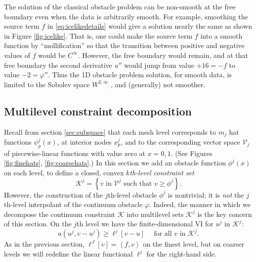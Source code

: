 \documentclass[letterpaper,final,12pt,reqno]{amsart}
\theoremstyle{claim}
\newcommand{\ip}[2]{\left<#1,#2\right>}
\numberwithin{equation}{section}
\numberwithin{figure}{section}
\numberwithin{table}{section}
\begin{document}
The solution of the classical obstacle problem can be non-smooth at the free boundary even when the data is arbitrarily smooth.  For example, smoothing the source term $f$ in \eqref{eq:icelikedetails} would give a solution nearly the same as shown in Figure \ref{fig:icelike}.  That is, one could make the source term $f$ into a smooth function by ``mollification'' \cite{Evans2010} so that the transition between positive and negative values of $f$ would be $C^\infty$.  However, the free boundary would remain, and at that free boundary the second derivative $u''$ would jump from value $+16=-f$ to value $-2=\varphi''$.  Thus the 1D obstacle problem solution, for smooth data, is limited to the Sobolev space $W^{2,\infty}$ \cite[section IV.6]{KinderlehrerStampacchia1980}, and (generally) not smoother.

\subsection*{Multilevel constraint decomposition}  Recall from section \ref{sec:subspace} that each mesh level corresponds to $m_j$ hat functions $\psi_p^j(x)$, at interior nodes $x_p^j$, and to the corresponding vector space $\mathcal{V}_j$ of piecewise-linear functions with value zero at $x=0,1$.  (See Figures \ref{fig:finehats}, \ref{fig:coarsehats}.)  In this section we add an obstacle function $\phi^j(x)$ on each level, to define a closed, convex $k$\emph{th-level constraint set}
\begin{equation}
\mathcal{K}^j = \left\{v \text{ in } \mathcal{V}^j \text{ such that } v \ge \phi^j\right\}.  \label{eq:levelKdefine}
\end{equation}
However, the construction of the $j$th-level obstacle $\phi^j$ is nontrivial; it is \emph{not} the $j$th-level interpolant of the continuum obstacle $\varphi$.  Indeed, the manner in which we decompose the continuum constraint $\mathcal{K}$ into multilevel sets $\mathcal{K}^j$ is the key concern of this section.  On the $j$th level we have the finite-dimensional VI for $u^j$ in $\mathcal{K}^j$:
\begin{equation}
  a(u^j,v-u^j) \ge \ell^j[v-u] \quad \text{ for all } v \text{ in } \mathcal{K}^j. \label{eq:levelvi}
\end{equation}
As in the previous section, $\ell^J[v]=\ip{f}{v}$ on the finest level, but on coarser levels we will redefine the linear functional $\ell^j$ for the right-hand side.
\end{document}
